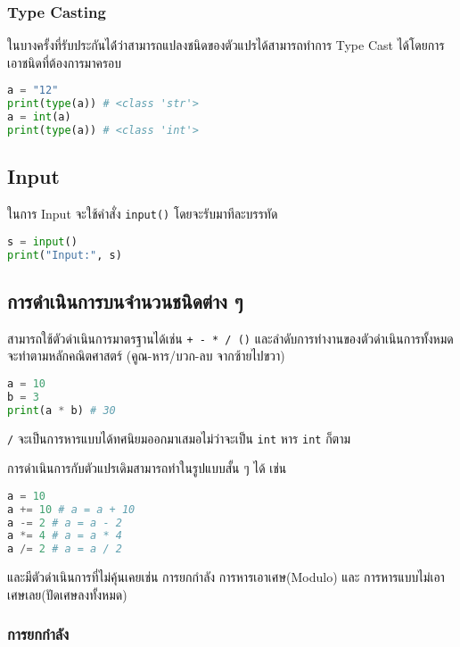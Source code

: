 \subsubsection{Type Casting}

ในบางครั้งที่รับประกันได้่ว่าสามารถแปลงชนิดของตัวแปรได้สามารถทำการ Type Cast ได้โดยการเอาชนิดที่ต้องการมาครอบ

\begin{lstlisting}[language=Python]
a = "12"
print(type(a)) # <class 'str'>
a = int(a)
print(type(a)) # <class 'int'>
\end{lstlisting}

\subsection{Input}

ในการ Input จะใช้คำสั่ง \verb|input()| โดยจะรับมาทีละบรรทัด

\begin{lstlisting}[language=Python]
s = input()
print("Input:", s)
\end{lstlisting}

\subsection{การดำเนินการบนจำนวนชนิดต่าง ๆ}

สามารถใช้ตัวดำเนินการมาตรฐานได้เช่น \verb|+ - * / ()| และลำดับการทำงานของตัวดำเนินการทั้งหมดจะทำตามหลักคณิตศาสตร์ (คูณ-หาร/บวก-ลบ จากซ้ายไปขวา)

\begin{lstlisting}[language=Python]
a = 10
b = 3
print(a * b) # 30
\end{lstlisting}

\begin{remark}
    \verb|/| จะเป็นการหารแบบได้ทศนิยมออกมาเสมอไม่ว่าจะเป็น \verb|int| หาร \verb|int| ก็ตาม
\end{remark}

การดำเนินการกับตัวแปรเดิมสามารถทำในรูปแบบสั้น ๆ ได้ เช่น

\begin{lstlisting}[language=Python]
a = 10
a += 10 # a = a + 10
a -= 2 # a = a - 2
a *= 4 # a = a * 4
a /= 2 # a = a / 2
\end{lstlisting}

และมีตัวดำเนินการที่ไม่คุ้นเคยเช่น การยกกำลัง การหารเอาเศษ(Modulo) และ การหารแบบไม่เอาเศษเลย(ปัดเศษลงทั้งหมด)

\subsubsection{การยกกำลัง}

